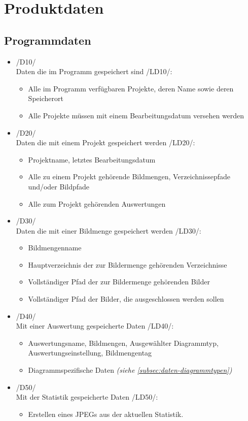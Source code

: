 \section{Produktdaten}

\subsection{Programmdaten}

\begin{itemize}
	\item /D10/\\Daten die im Programm gespeichert sind /LD10/:
	\begin{itemize} 
		\item Alle im Programm verfügbaren Projekte, deren Name sowie deren Speicherort
		\item Alle Projekte müssen mit einem Bearbeitungsdatum versehen werden
	\end{itemize}

	\item /D20/\\Daten die mit einem Projekt gespeichert werden /LD20/:
	\begin{itemize}
		\item Projektname, letztes Bearbeitungsdatum
		\item Alle zu einem Projekt gehörende Bildmengen, Verzeichnissepfade und/oder Bildpfade
		\item Alle zum Projekt gehörenden Auswertungen
	\end{itemize}

	\item /D30/\\Daten die mit einer Bildmenge gespeichert werden /LD30/:
	\begin{itemize}
		\item Bildmengenname
		\item Hauptverzeichnis der zur Bildermenge gehörenden Verzeichnisse
		\item Vollständiger Pfad der zur Bildermenge gehörenden Bilder
		\item Vollständiger Pfad der Bilder, die ausgeschlossen werden sollen
	\end{itemize}
	
	\item /D40/\\Mit einer Auswertung gespeicherte Daten /LD40/:
	\begin{itemize}
		\item Auswertungsname, Bildmengen, Ausgewählter Diagrammtyp, Auswertungseinstellung, Bildmengentag
		\item Diagrammspezifische Daten \itshape{(siehe \ref{subsec:daten-diagrammtypen})}
	\end{itemize}
		
	\item /D50/\\ Mit der Statistik gespeicherte Daten /LD50/:
	\begin{itemize}
		\item Erstellen eines JPEGs aus der aktuellen Statistik.
	\end{itemize}
\end{itemize}

